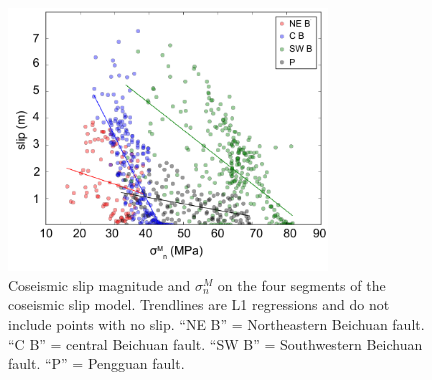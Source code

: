 \documentclass[draft,jgrga]{AGUTeX}
\begin{document}
\begin{figure}%
\centering
\includegraphics[width=20pc]{../figures/feng_slip_sig_n_scatter.pdf}
\caption{Coseismic slip magnitude and $\sigma^M_n$ on the four segments
of the \citet{feng2010} coseismic slip model. Trendlines are
L1 regressions and do not include points with no slip. ``NE B'' =
Northeastern Beichuan fault. ``C B'' = central Beichuan fault. ``SW B'' =
Southwestern Beichuan fault. ``P'' = Pengguan fault.}
\label{fig:feng_slip_sig_n_scatter}
\end{figure}
\end{document}
